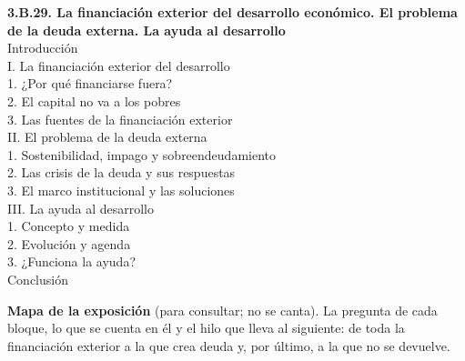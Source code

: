 \documentclass[11pt]{article}
\begin{document}
\begin{esquema}[unbreakable]
\textbf{3.B.29. La financiación exterior del desarrollo económico. El problema de la deuda externa. La ayuda al desarrollo}\\[2pt]
Introducción\\
I. La financiación exterior del desarrollo\\
\hspace*{1.5em}1. ¿Por qué financiarse fuera?\\
\hspace*{1.5em}2. El capital no va a los pobres\\
\hspace*{1.5em}3. Las fuentes de la financiación exterior\\
II. El problema de la deuda externa\\
\hspace*{1.5em}1. Sostenibilidad, impago y sobreendeudamiento\\
\hspace*{1.5em}2. Las crisis de la deuda y sus respuestas\\
\hspace*{1.5em}3. El marco institucional y las soluciones\\
III. La ayuda al desarrollo\\
\hspace*{1.5em}1. Concepto y medida\\
\hspace*{1.5em}2. Evolución y agenda\\
\hspace*{1.5em}3. ¿Funciona la ayuda?\\
Conclusión
\end{esquema}

\begin{anotaciones}
\textbf{Mapa de la exposición} (para consultar; no se canta). La pregunta de cada bloque, lo que se cuenta en él y el hilo que lleva al siguiente: de toda la financiación exterior a la que crea deuda y, por último, a la que no se devuelve.
\begin{infografiacaja}
\caption{Mapa de la exposición: la pregunta de cada bloque y el hilo que los une}\label{figu:mapa-tema}
\end{infografiacaja}
\end{anotaciones}
\end{document}

